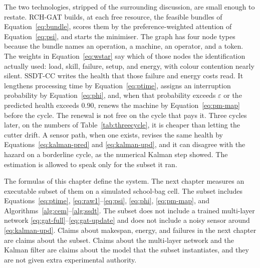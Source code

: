 The two technologies, stripped of the surrounding discussion, are small enough to restate. RCH-GAT builds, at each free resource, the feasible bundles of Equation~\eqref{eq:bundle}, scores them by the preference-weighted attention of Equation~\eqref{eq:psi}, and starts the minimiser. The graph has four node types because the bundle names an operation, a machine, an operator, and a token. The weights in Equation~\eqref{eq:wstar} say which of those nodes the identification actually used: load, skill, failure, setup, and energy, with colour contention nearly silent. SSDT-CC writes the health that those failure and energy costs read. It lengthens processing time by Equation~\eqref{eq:ptime}, assigns an interruption probability by Equation~\eqref{eq:phi}, and, when that probability exceeds \(\varepsilon\) or the predicted health exceeds \(0.90\), renews the machine by Equation~\eqref{eq:pm-map} before the cycle. The renewal is not free on the cycle that pays it. Three cycles later, on the numbers of Table~\ref{tab:threecycle}, it is cheaper than letting the cutter drift. A sensor path, when one exists, revises the same health by Equations~\eqref{eq:kalman-pred} and \eqref{eq:kalman-upd}, and it can disagree with the hazard on a borderline cycle, as the numerical Kalman step showed. The estimation is allowed to speak only for the subset it ran.

The formulas of this chapter define the system. The next chapter measures an executable subset of them on a simulated school-bag cell. The subset includes Equations~\eqref{eq:ptime}, \eqref{eq:raw1}--\eqref{eq:psi}, \eqref{eq:phi}, \eqref{eq:pm-map}, and Algorithms~\ref{alg:cem}--\ref{alg:ssdt}. The subset does not include a trained multi-layer network \eqref{eq:gat-full}--\eqref{eq:gat-update} and does not include a noisy sensor around \eqref{eq:kalman-upd}. Claims about makespan, energy, and failures in the next chapter are claims about the subset. Claims about the multi-layer network and the Kalman filter are claims about the model that the subset instantiates, and they are not given extra experimental authority.
